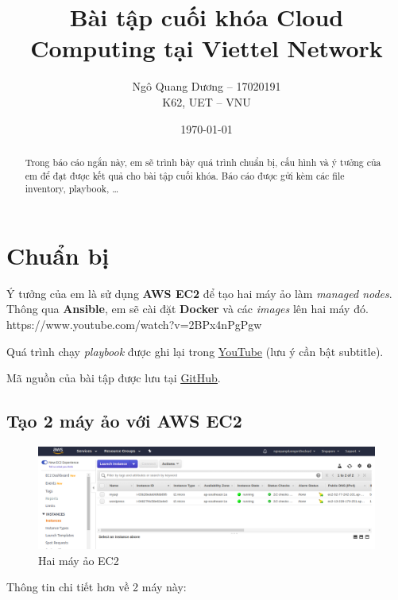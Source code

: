 \documentclass{article}
\title{\textbf{Bài tập cuối khóa Cloud Computing tại Viettel Network}}
\author{Ngô Quang Dương -- 17020191 \\ K62, UET -- VNU}
\date{\today}
\begin{document}
\maketitle

\begin{abstract}
Trong báo cáo ngắn này, em sẽ trình bày quá trình chuẩn bị, cấu hình và ý tưởng của em để đạt được kết quả cho bài tập cuối khóa. Báo cáo được gửi kèm các file inventory, playbook, \ldots
\end{abstract}


\tableofcontents

\newpage

\section{Chuẩn bị}

\par Ý tưởng của em là sử dụng \textbf{AWS EC2} để tạo hai máy ảo làm \textit{managed nodes}. Thông qua \textbf{Ansible}, em sẽ cài đặt \textbf{Docker} và các \textit{images} lên hai máy đó.
https://www.youtube.com/watch?v=2BPx4nPgPgw
\par Quá trình chạy \textit{playbook} được ghi lại trong \href{https://www.youtube.com/watch?v=2BPx4nPgPgw}{\underline{YouTube}} (lưu ý cần bật subtitle).

\par Mã nguồn của bài tập được lưu tại \href{https://github.com/duong755/vtnet-course}{\underline{GitHub}}.

\subsection{Tạo 2 máy ảo với AWS EC2}

\begin{figure}[htp]
    \centering
    \includegraphics[width=\textwidth]{ec2.png}
    \caption{Hai máy ảo EC2}
\end{figure}

\par Thông tin chi tiết hơn về 2 máy này:
\end{document}

